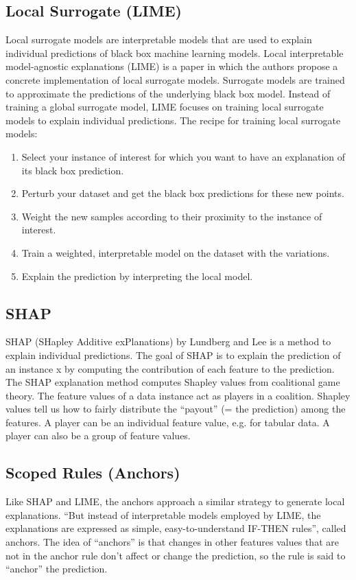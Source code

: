 \documentclass[a4paper, 10pt,]{JournalArticle}
\begin{document}
\subsection{Local Surrogate (LIME)}
Local surrogate models are interpretable models that are used to explain individual predictions of black box machine learning models. Local interpretable model-agnostic explanations (LIME) \cite{ribeiro2016should} is a paper in which the authors propose a concrete implementation of local surrogate models. Surrogate models are trained to approximate the predictions of the underlying black box model. Instead of training a global surrogate model, LIME focuses on training local surrogate models to explain individual predictions.
\newpage
The recipe for training local surrogate models:

\begin{enumerate}[noitemsep]
\item Select your instance of interest for which you want to have an explanation of its black box prediction.
\item Perturb your dataset and get the black box predictions for these new points.
\item Weight the new samples according to their proximity to the instance of interest.
\item Train a weighted, interpretable model on the dataset with the variations.
\item Explain the prediction by interpreting the local model.

\end{enumerate}


\subsection{SHAP}
SHAP \cite{lundberg2017unified} (SHapley Additive exPlanations) by Lundberg and Lee is a method to explain individual predictions. The goal of SHAP is to explain the prediction of an instance x by computing the contribution of each feature to the prediction. The SHAP explanation method computes Shapley values from coalitional game theory. The feature values of a data instance act as players in a coalition. Shapley values tell us how to fairly distribute the “payout” (= the prediction) among the features. A player can be an individual feature value, e.g. for tabular data. A player can also be a group of feature values.

\subsection{Scoped Rules (Anchors)}
Like SHAP and LIME, the anchors approach a similar strategy to generate local explanations. “But instead of interpretable models employed by LIME, the explanations are expressed as simple, easy-to-understand IF-THEN rules”, called anchors. The idea of “anchors” is that changes in other features values that are not in the anchor rule don’t affect or change the prediction, so the rule is said to “anchor” the prediction. \cite{molnar2022}
\end{document}
